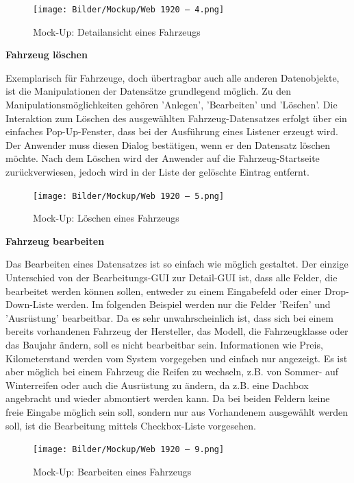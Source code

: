\begin{figure}[!ht]
    \centering
    \texttt{[image: Bilder/Mockup/Web 1920 – 4.png]}
    \caption{Mock-Up: Detailansicht eines Fahrzeugs}
    \label{mu:fahrzeugdetails}
\end{figure}

\newpage

\textbf{Fahrzeug löschen}

Exemplarisch für Fahrzeuge, doch übertragbar auch alle anderen Datenobjekte, ist die Manipulationen der Datensätze grundlegend möglich. 
Zu den Manipulationsmöglichkeiten gehören 'Anlegen', 'Bearbeiten' und 'Löschen'. 
Die Interaktion zum Löschen des ausgewählten Fahrzeug-Datensatzes erfolgt über ein einfaches Pop-Up-Fenster, dass bei der Ausführung eines Listener erzeugt wird.  
Der Anwender muss diesen Dialog bestätigen, wenn er den Datensatz löschen möchte.
Nach dem Löschen wird der Anwender auf die Fahrzeug-Startseite zurückverwiesen, jedoch wird in der Liste der gelöschte Eintrag entfernt. 


\begin{figure}[!ht]
    \centering
    \texttt{[image: Bilder/Mockup/Web 1920 – 5.png]}
    \caption{Mock-Up: Löschen eines Fahrzeugs}
    \label{mu:loeschen}
\end{figure}

\newpage

\textbf{Fahrzeug bearbeiten}

Das Bearbeiten eines Datensatzes ist so einfach wie möglich gestaltet. Der einzige Unterschied von der Bearbeitungs-GUI zur Detail-GUI ist, dass alle Felder, die bearbeitet werden können sollen, entweder zu einem Eingabefeld oder einer Drop-Down-Liste werden. Im folgenden Beispiel werden nur die Felder 'Reifen' und 'Ausrüstung' bearbeitbar. Da es sehr unwahrscheinlich ist, dass sich bei einem bereits vorhandenen Fahrzeug der Hersteller, das Modell, die Fahrzeugklasse oder das Baujahr ändern, soll es nicht bearbeitbar sein. Informationen wie Preis, Kilometerstand werden vom System vorgegeben und einfach nur angezeigt. Es ist aber möglich bei einem Fahrzeug die Reifen zu wechseln, z.B. von Sommer- auf Winterreifen oder auch die Ausrüstung zu ändern, da z.B. eine Dachbox angebracht und wieder abmontiert werden kann. Da bei beiden Feldern keine freie Eingabe möglich sein soll, sondern nur aus Vorhandenem ausgewählt werden soll, ist die Bearbeitung mittels Checkbox-Liste vorgesehen. 


\begin{figure}[!ht]
    \centering
    \texttt{[image: Bilder/Mockup/Web 1920 – 9.png]}
    \caption{Mock-Up: Bearbeiten eines Fahrzeugs}
    \label{mu:bearbeiten}
\end{figure}

